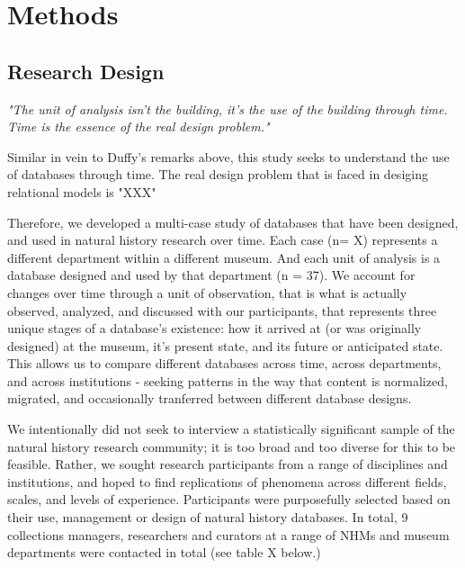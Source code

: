 \section{Methods}

\subsection{Research Design}
\textit{"The unit of analysis isn't the building, it's the use of the building through time. Time is the essence of the real design problem."}\cite{duffy1990measuring}

Similar in vein to Duffy's remarks above, this study seeks to understand the use of databases through time. The real design problem that is faced in desiging relational models is "XXX" 

Therefore, we developed a multi-case study of databases that have been designed, and used in natural history research over time. Each case (n= X) represents a different department within a different museum. And each unit of analysis is a database designed and used by that department (n = 37). We account for changes over time through a unit of observation, that is what is actually observed, analyzed, and discussed with our participants, that represents three unique stages of a database's existence: how it arrived at (or was originally designed) at the museum, it's present state, and its future or anticipated state. This allows us to compare different databases across time, across departments, and across institutions - seeking patterns in the way that content is normalized, migrated, and occasionally tranferred between different database designs. 

We intentionally did not seek to interview a statistically significant sample of the natural history research community; it is too broad and too diverse for this to be feasible.  Rather, we sought research participants from a range of disciplines and institutions, and hoped to find replications of phenomena across different fields, scales, and levels of experience. Participants were purposefully selected based on their use, management or design of natural history databases. In total, 9 collections managers, researchers and curators at a range of NHMs and museum departments were contacted in total (see table X below.) 

